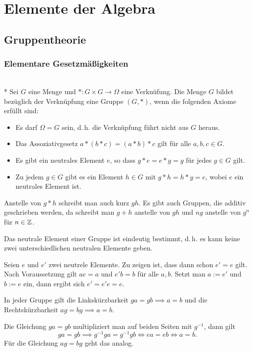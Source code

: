 
\chapter{Elemente der Algebra}

\section{Gruppentheorie}

\subsection{Elementare Gesetzmäßigkeiten}
\begin{Definition}[Gruppe]\mbox{}\\*
Sei $G$ eine Menge und $*\colon G\times G\to\Omega$ eine Verknüfung.
Die Menge $G$ bildet bezüglich der Verknüpfung eine Gruppe $(G,*)$,
wenn die folgenden Axiome erfüllt sind:
\begin{itemize}
\item[\strong{(E)}]
Es darf $\Omega=G$ sein, d.\,h. die Verknüpfung führt nicht aus $G$ heraus.
\item[\strong{(A)}]
Das Assoziativgesetz $a*(b*c)=(a*b)*c$ gilt für alle $a,b,c\in G$.
\item[\strong{(N)}]
Es gibt ein neutrales Element $e$, so dass $g*e=e*g=g$ für jedes
$g\in G$ gilt.
\item[\strong{(I)}]
Zu jedem $g\in G$ gibt es ein Element $h\in G$ mit $g*h=h*g=e$,
wobei $e$ ein neutrales Element ist.
\end{itemize}
\end{Definition}
Anstelle von $g*h$ schreibt man auch kurz $gh$. Es gibt auch Gruppen,
die additiv geschrieben werden, da schreibt man $g+h$ anstelle von
$gh$ und $ng$ anstelle von $g^n$ für $n\in\mathbb Z$.

\begin{Satz} Das neutrale Element einer Gruppe ist eindeutig bestimmt,
d.\,h. es kann keine zwei unterschiedlichen neutralen Elemente geben.
\end{Satz}
 Seien $e$ und $e'$ zwei neutrele Elemente.
Zu zeigen ist, dass dann schon $e'=e$ gilt. Nach Voraussetzung
gilt $ae=a$ und $e'b=b$ für alle $a,b$. Setzt man $a:=e'$ und
$b:=e$ ein, dann ergibt sich $e' = e'e = e.$\;\qedsymbol

\begin{Satz}
In jeder Gruppe gilt die Linkskürzbarkeit $ga=gb\implies a=b$
und die Rechtskürzbarkeit $ag=bg\implies a=b$.
\end{Satz}
 Die Gleichung $ga=gb$ multipliziert man auf beiden
Seiten mit $g^{-1}$, dann gilt
\[ga=gb \implies g^{-1}ga=g^{-1}gb \iff ea=eb \iff a=b.\]
Für die Gleichung $ag=bg$ geht das analog.\;\qedsymbol

